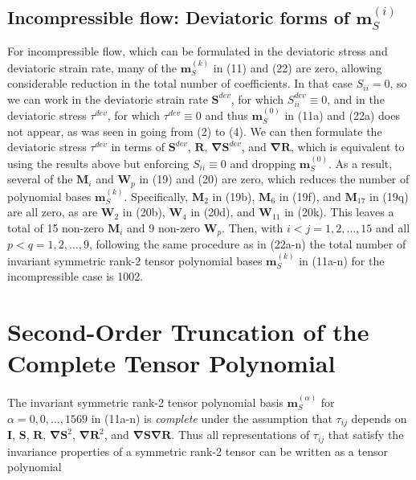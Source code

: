 \subsection{Incompressible flow: Deviatoric forms of $\mathbf{m}^{(i)}_S$ }

For incompressible flow, which can be formulated in the deviatoric stress and deviatoric strain rate, many of the $\mathbf{m}^{(k)}_S$  in (11) and (22) are zero, allowing considerable reduction in the total number of coefficients.  In that case $S_{ii} = 0$, so we can work in the deviatoric strain rate $\mathbf{S}^{dev}$, for which $S^{dev}_{ii} \equiv 0$, and in the deviatoric stress $\tau^{dev}$, for which $\tau^{dev} \equiv 0$  and thus $\mathbf{m}^{(0)}_S$  in (11a) and (22a) does not appear, as was seen in going from (2) to (4).  We can then formulate the deviatoric stress $\tau^{dev}$  in terms of $\mathbf{S}^{dev}$, $\mathbf{R}$, $\mathbf{\nabla S}^{dev}$, and $\mathbf{\nabla R}$, which is equivalent to using the results above but enforcing $S_{ii} \equiv 0$  and dropping $\mathbf{m}^{(0)}_S$.  As a result, several of the  $\mathbf{M}_i$ and $\mathbf{W}_p$ in (19) and (20) are zero, which reduces the number of polynomial bases $\mathbf{m}^{(k)}_S$.  
Specifically,  $\mathbf{M}_2$ in (19b),  $\mathbf{M}_6$ in (19f), and $\mathbf{M}_{17}$  in (19q) are all zero, as are $\mathbf{W}_2$  in (20b),  $\mathbf{W}_4$ in (20d), and $\mathbf{W}_{11}$  in (20k).  This leaves a total of 15 non-zero $\mathbf{M}_i$  and 9 non-zero $\mathbf{W}_p$.  Then, with $i<j = 1,2,\ldots,15$  and all $p<q = 1,2,\ldots,9$, following the same procedure as in (22a-n) the total number of invariant symmetric rank-2 tensor polynomial bases   $\mathbf{m}^{(k)}_S$ in (11a-n) for the incompressible case is 1002.  


\section{Second-Order Truncation of the Complete Tensor Polynomial}

The invariant symmetric rank-2 tensor polynomial basis  $\mathbf{m}^{(\alpha)}_S$  for  $\alpha = 0,0,\ldots,1569$ in (11a-n) is \textit{complete} under the assumption that  $\tau_{ij}$ depends on $\mathbf{I}$, $\mathbf{S}$, $\mathbf{R}$, $\mathbf{\nabla S}^{2}$, $\mathbf{\nabla R}^{2}$, and $\mathbf{\nabla S \nabla R}$.  Thus all representations of $\tau_{ij}$ that satisfy the invariance properties of a symmetric rank-2 tensor can be written as a tensor polynomial

